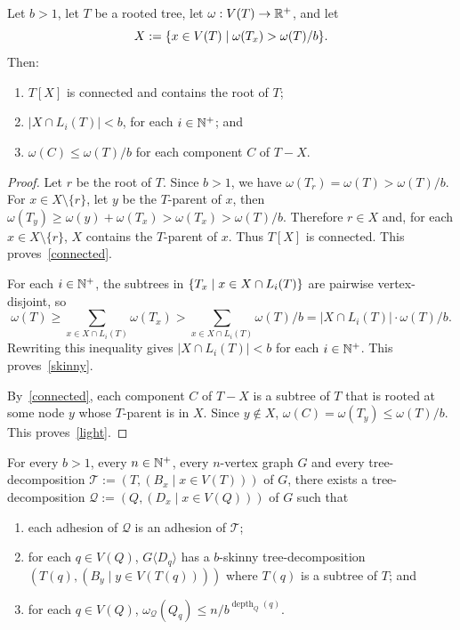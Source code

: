 \documentclass{patmorin}
\renewcommand{\ge}{\geqslant}
\renewcommand{\le}{\leqslant}
\newcommand{\piotr}[1]{\textcolor{red}{PiMi: #1}}
\newcommand{\torso}[2]{{#1}\langle{#2}\rangle}
\DeclareMathOperator{\depth}{depth}
\DeclarePairedDelimiter{\set}{\{}{\}}
\begin{document}
  \begin{lem}\label{low_pathwidth_separator}
    Let $b>1$, let $T$ be a rooted tree, let $\omega:V(T)\to\mathbb{R}^+$, and let
    \[
    X:=\set{x\in V(T)\mid\omega(T_x)>\omega(T)/b}.
    \]
    Then:
    \begin{enumerate}[nosep,nolistsep,label=(\alph*)]
      \item\label{connected} $T[X]$ is connected and contains the root of $T$;
      \item\label{skinny} $|X\cap L_i(T)|< b$, for each $i\in\mathbb{N}^+$; and
      \item\label{light} $\omega(C)\le \omega(T)/b$ for each component $C$ of $T-X$.
    \end{enumerate}
  \end{lem}

  \begin{proof}
    Let $r$ be the root of $T$.  Since $b>1$, we have $\omega(T_r)=\omega(T)>\omega(T)/b$. %
    For $x\in X\setminus\{r\}$, let $y$ be the $T$-parent of $x$, then
    $\omega(T_y)\ge \omega(y)+\omega(T_x)>\omega(T_x)>\omega(T)/b$.
    Therefore $r\in X$ and, for each $x\in X\setminus\{r\}$, $X$ contains the $T$-parent of $x$. Thus $T[X]$ is connected.
    This proves~\ref{connected}.

    For each $i\in\mathbb{N}^+$, the subtrees in $\set{T_x \mid x\in X\cap L_i(T)}$ are pairwise vertex-disjoint, so
    \[
    \omega(T) \ge \sum_{x\in X\cap L_i(T)} \omega(T_x)> \sum_{x\in X\cap L_i(T)}\omega(T)/b = |X\cap L_i(T)|\cdot\omega(T)/b.
    \]
    Rewriting this inequality gives $|X\cap L_i(T)|<b$ for each $i\in\mathbb{N}^+$.
    This proves~\ref{skinny}.

    By~\ref{connected}, each component $C$ of $T-X$ is a subtree of $T$ that is rooted at some node $y$ whose $T$-parent is in $X$.  Since  $y\not\in X$, $\omega(C)=\omega(T_y)\le \omega(T)/b$.
    This proves~\ref{light}.
  \end{proof}

  \begin{cor}\label{b_skinny_decomp}
    For every $b>1$, every $n\in\mathbb{N}^+$, every $n$-vertex graph $G$ and every tree-decomposition $\mathcal{T}:=(T,(B_x\mid x\in V(T)))$ of $G$, there exists a tree-decomposition $\mathcal{Q}:=(Q,(D_x\mid x\in V(Q)))$ of $G$ such that
    \begin{enumerate}[nosep,nolistsep,label=(\alph*)]
      \item\label{prop_adhesion}
      each adhesion of $\mathcal{Q}$ is an adhesion of $\mathcal{T}$;
      \item\label{prop_skinny_torso} for each $q\in V(Q)$, $\torso{G}{D_q}$ has a $b$-skinny tree-decomposition $(T(q), (B_y\mid y\in V(T(q))))$ where $T(q)$ is a subtree of $T$; and
      \item\label{prop_geometric} for each $q\in V(Q)$, $\omega_\mathcal{Q}(Q_{q})\le n/b^{\depth_{Q}(q)}$.
    \end{enumerate}
  \end{cor}
\end{document}
